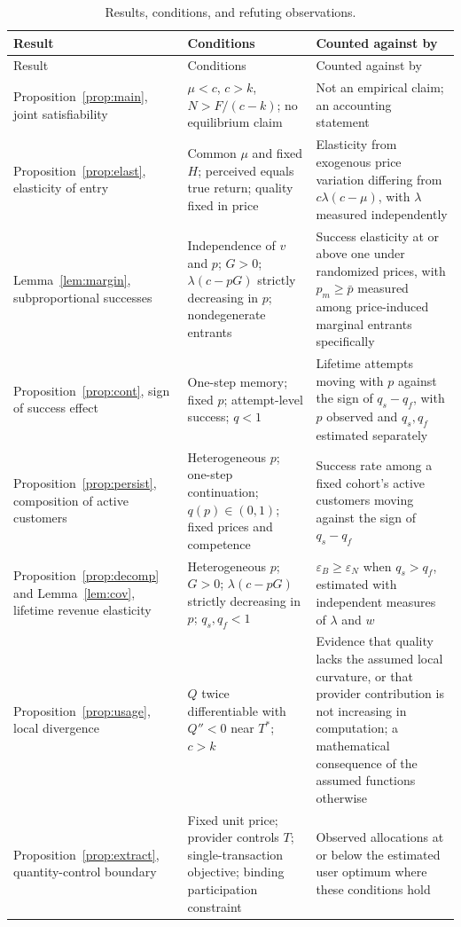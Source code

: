 \documentclass[11pt]{article}
\theoremstyle{remark}
\begin{document}
\begin{longtable}{|p{}|p{}|p{}|}
\caption{Results, conditions, and refuting observations.}\label{tab:summary}\\
\hline
Result & Conditions & Counted against by \\
\hline
\endfirsthead
\hline
Result & Conditions & Counted against by \\
\hline
\endhead
Proposition~\ref{prop:main}, joint satisfiability & $\mu<c$, $c>k$, $N>F/(c-k)$; no equilibrium claim & Not an empirical claim; an accounting statement \\
\hline
Proposition~\ref{prop:elast}, elasticity of entry & Common $\mu$ and fixed $H$; perceived equals true return; quality fixed in price & Elasticity from exogenous price variation differing from $c\lambda(c-\mu)$, with $\lambda$ measured independently \\
\hline
Lemma~\ref{lem:margin}, subproportional successes & Independence of $v$ and $p$; $G>0$; $\lambda(c-pG)$ strictly decreasing in $p$; nondegenerate entrants & Success elasticity at or above one under randomized prices, with $p_m\ge\bar p$ measured among price-induced marginal entrants specifically \\
\hline
Proposition~\ref{prop:cont}, sign of success effect & One-step memory; fixed $p$; attempt-level success; $q<1$ & Lifetime attempts moving with $p$ against the sign of $q_s-q_f$, with $p$ observed and $q_s,q_f$ estimated separately \\
\hline
Proposition~\ref{prop:persist}, composition of active customers & Heterogeneous $p$; one-step continuation; $q(p)\in(0,1)$; fixed prices and competence & Success rate among a fixed cohort's active customers moving against the sign of $q_s-q_f$ \\
\hline
Proposition~\ref{prop:decomp} and Lemma~\ref{lem:cov}, lifetime revenue elasticity & Heterogeneous $p$; $G>0$; $\lambda(c-pG)$ strictly decreasing in $p$; $q_s,q_f<1$ & $\varepsilon_B\ge\varepsilon_N$ when $q_s>q_f$, estimated with independent measures of $\lambda$ and $w$ \\
\hline
Proposition~\ref{prop:usage}, local divergence & $Q$ twice differentiable with $Q''<0$ near $T^{*}$; $c>k$ & Evidence that quality lacks the assumed local curvature, or that provider contribution is not increasing in computation; a mathematical consequence of the assumed functions otherwise \\
\hline
Proposition~\ref{prop:extract}, quantity-control boundary & Fixed unit price; provider controls $T$; single-transaction objective; binding participation constraint & Observed allocations at or below the estimated user optimum where these conditions hold \\
\hline
\end{longtable}
\end{document}
